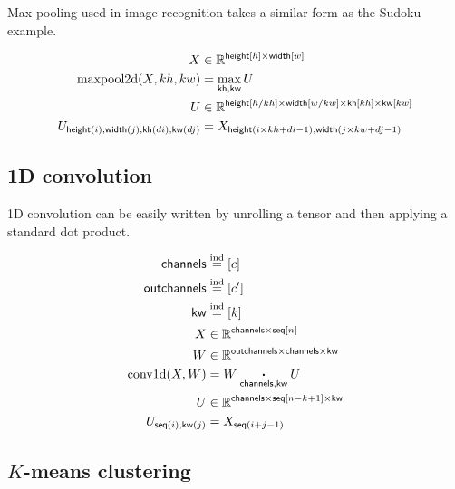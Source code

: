 \documentclass{article}
\newcommand{\reals}{\mathbb{R}}
\begin{document}
Max pooling used in image recognition takes a similar form as the Sudoku example.

\begin{align*}
X &\in \reals^{\nset{height}{h} \times \nset{width}{w}} \\
\text{maxpool2d}(X, kh, kw) &=  \nfun{kh, kw}{max} U \\
U &\in \reals^{{\nset{height}{h / kh} \times \nset{width}{w / kw} \times \nset{kh}{kh} \times \nset{kw}{kw}}} \\
U_{\nidx{height}{i}, \nidx{width}{j}, \nidx{kh}{di}, \nidx{kw}{dj}} & = X_{\nidx{height}{i \times kh + di -1}, \nidx{width}{j \times kw + dj -1}}  
\end{align*}



\subsection{1D convolution}

1D convolution can be easily written by unrolling a tensor and then
applying a standard dot product.

\begin{align*}
\name{channels} &\ndef [c] \\  
\name{outchannels} &\ndef [c'] \\  
\name{kw} &\ndef [k] \\  
X &\in \reals^{{\name{channels} \times \nset{seq}{n}}}  \\
W &\in \reals^{{\name{outchannels} \times \name{channels} \times \name{kw}}}  \\
\text{conv1d}(X, W) &= W \ndot{channels, kw} U \\
U &\in \reals^{{\name{channels} \times \nset{seq}{n-k +1} \times \name{kw}}}  \\
U_{\nidx{seq}{i}, \nidx{kw}{j}} & = X_{\nidx{seq}{i+j - 1}}  
\end{align*} 


\subsection{$K$-means clustering}
\end{document}
